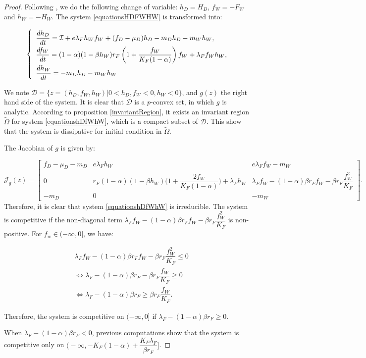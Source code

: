 \documentclass{article}
\newcommand{\lfw}{\lambda_{F}}
\newcommand{\lfw}{\lambda_{F}}
\newcommand{\cI}{\mathcal{I}}
\begin{document}
\begin{proof}
Following \cite{wang_predator-prey_1997}, we do the following change of variable: $h_D =  H_D$, $f_W = -F_W$ and $h_W = -H_W$.  The system \eqref{equationsHDFWHW} is transformed into:

\begin{equation}
\def\arraystretch{2}
\left\{ \begin{array}{l}
\dfrac{dh_D}{dt}= \cI + e\lfw h_W f_W + (f_D - \mu_D) h_D - m_D h_D - m_W h_W, \\
\dfrac{df_W}{dt} = (1-\alpha)(1 - \beta h_W) r_F \left(1 + \dfrac{f_W}{K_F(1-\alpha)} \right) f_W + \lfw f_W h_W, \\
\dfrac{dh_W}{dt}= -m_D h_D - m_W h_W 
\end{array} \right.
\label{equationshDfWhW}
\end{equation}


We note $\mathcal{D} = \Big\{z = (h_D, f_W, h_W) | 0 < h_D, f_W < 0, h_W < 0 \Big\}$, and $g(z)$ the right hand side of the system. It is clear that $\mathcal{D}$ is a $p$-convex set, in which $g$ is analytic. According to proposition \ref{invariantRegion}, it exists an invariant region $\tilde{\Omega}$ for system \eqref{equationshDfWhW}, which is a compact subset of $\mathcal{D}$. This show that the system is dissipative for initial condition in  $\tilde{\Omega}$.

The Jacobian of $g$ is given by:

\begin{equation*}
\mathcal{J}_g(z) = \begin{bmatrix}
f_D -\mu_D - m_D & e \lfw h_W & e \lfw f_W - m_W \\
0 & r_F (1-\alpha)(1-\beta h_W) \Big(1 + \dfrac{2 f_W}{K_F(1-\alpha)}\Big) + \lfw  h_W & \lfw f_W - (1-\alpha)\beta r_F f_W - \beta r_F \dfrac{f_W^2}{K_F}\\
-m_D & 0 & -m_W
\end{bmatrix}.
\end{equation*}
Therefore, it is clear that system \eqref{equationshDfWhW} is irreducible. The system is competitive if the non-diagonal term $\lfw f_W - (1-\alpha)\beta r_F f_W - \beta r_F \dfrac{f_W^2}{K_F}$ is non-positive. For $f_w \in (-\infty, 0]$, we have:

\begin{align*}
&\lfw f_W - (1-\alpha)\beta r_F f_W - \beta r_F \dfrac{f_W^2}{K_F} \leq 0 \\
&\Leftrightarrow \lfw - (1-\alpha)\beta r_F - \beta r_F \dfrac{f_W}{K_F} \geq 0 \\
&\Leftrightarrow \lfw - (1-\alpha)\beta r_F \geq \beta r_F \dfrac{f_W}{K_F}.
\end{align*}

Therefore, the system is competitive on $(-\infty, 0]$ if $\lfw - (1-\alpha)\beta r_F \geq 0$. 

When $\lfw - (1-\alpha)\beta r_F<0$, previous computations show that the system is competitive only on $\Big(-\infty, -K_F(1-\alpha) + \dfrac{K_F \lfw}{\beta r_F}\Big]$. 





\end{proof}
\end{document}
